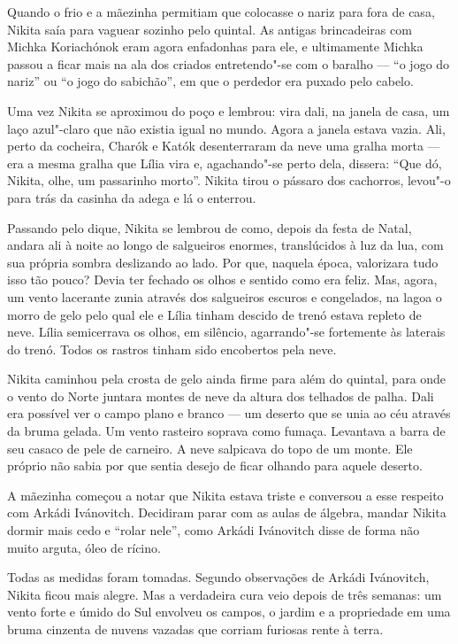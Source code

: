 Quando o frio e a mãezinha permitiam que colocasse o nariz para fora de
casa, Nikita saía para vaguear sozinho pelo quintal. As antigas brincadeiras
com Michka Koriachónok eram agora enfadonhas para ele, e ultimamente
Michka passou a ficar mais na ala dos criados entretendo"-se com o baralho --- ``o
jogo do nariz'' ou ``o jogo do sabichão'', em que o perdedor era puxado
pelo cabelo.

Uma vez Nikita se aproximou do poço e lembrou: vira dali, na janela de casa, um
laço azul"-claro que não existia igual no mundo. Agora a janela estava
vazia. Ali, perto da cocheira, Charók e Katók desenterraram da neve uma
gralha morta --- era a mesma gralha que Lília vira e, agachando"-se perto
dela, dissera: ``Que dó, Nikita, olhe, um passarinho morto''. Nikita
tirou o pássaro dos cachorros, levou"-o para trás da casinha da adega e
lá o enterrou.

Passando pelo dique, Nikita se lembrou de como, depois da festa de Natal, andara ali à noite ao longo de salgueiros enormes, translúcidos à luz da lua,
com sua própria sombra deslizando ao lado. Por que, naquela época,
valorizara tudo isso tão pouco? Devia ter fechado os olhos e sentido
como era feliz. Mas, agora, um vento lacerante zunia através dos
salgueiros escuros e congelados, na lagoa o morro de gelo pelo qual ele
e Lília tinham descido de trenó estava repleto de neve. Lília
semicerrava os olhos, em silêncio, agarrando"-se fortemente às laterais
do trenó. Todos os rastros tinham sido encobertos pela neve.

Nikita caminhou pela crosta de gelo ainda firme para além do quintal,
para onde o vento do Norte juntara montes de neve da altura dos telhados
de palha. Dali era possível ver o campo plano e branco --- um deserto
que se unia ao céu através da bruma gelada. Um vento rasteiro soprava
como fumaça. Levantava a barra de seu casaco de pele de carneiro. A neve
salpicava do topo de um monte. Ele próprio não sabia por que sentia
desejo de ficar olhando para aquele deserto.

A mãezinha começou a notar que Nikita estava triste e conversou a esse
respeito com Arkádi Ivánovitch. Decidiram parar com as aulas de álgebra,
mandar Nikita dormir mais cedo e ``rolar nele'', como Arkádi Ivánovitch
disse de forma não muito arguta, óleo de rícino.

Todas as medidas foram tomadas. Segundo observações de Arkádi
Ivánovitch, Nikita ficou mais alegre. Mas a verdadeira cura veio depois
de três semanas: um vento forte e úmido do Sul envolveu os campos, o
jardim e a propriedade em uma bruma cinzenta de nuvens vazadas que
corriam furiosas rente à terra.

